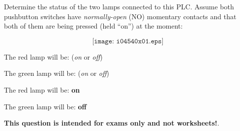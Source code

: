 

Determine the status of the two lamps connected to this PLC.  Assume both pushbutton switches have {\it normally-open} (NO) momentary contacts and that both of them are being pressed (held ``on'') at the moment:

$$\texttt{[image: i04540x01.eps]}$$

\vskip 10pt

The red lamp will be: ({\it on} or {\it off})

\vskip 10pt

The green lamp will be: ({\it on} or {\it off})







The red lamp will be: {\bf on}

\vskip 10pt

The green lamp will be: {\bf off}







{\bf This question is intended for exams only and not worksheets!}.


